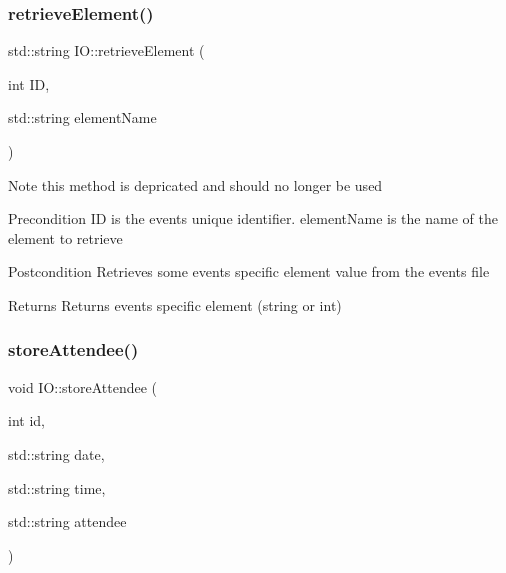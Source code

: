\subsubsection{\texorpdfstring{retrieve\+Element()}{retrieveElement()}}
{\footnotesize\ttfamily std\+::string I\+O\+::retrieve\+Element (\begin{DoxyParamCaption}\item[{int}]{ID,  }\item[{std\+::string}]{element\+Name }\end{DoxyParamCaption})}

\begin{DoxyNote}{Note}
this method is depricated and should no longer be used 
\end{DoxyNote}
\begin{DoxyPrecond}{Precondition}
ID is the event\textquotesingle{}s unique identifier. element\+Name is the name of the element to retrieve 
\end{DoxyPrecond}
\begin{DoxyPostcond}{Postcondition}
Retrieves some event\textquotesingle{}s specific element value from the events file 
\end{DoxyPostcond}
\begin{DoxyReturn}{Returns}
Returns event\textquotesingle{}s specific element (string or int) 
\end{DoxyReturn}
\mbox{\label{classIO_ae80862e6964e82c2f2e6d7f3b931f347}} 
\subsubsection{\texorpdfstring{store\+Attendee()}{storeAttendee()}}
{\footnotesize\ttfamily void I\+O\+::store\+Attendee (\begin{DoxyParamCaption}\item[{int}]{id,  }\item[{std\+::string}]{date,  }\item[{std\+::string}]{time,  }\item[{std\+::string}]{attendee }\end{DoxyParamCaption})}

